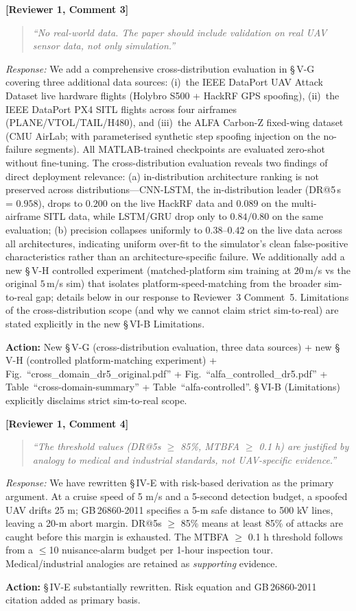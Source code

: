 \documentclass[11pt, a4paper]{article}
\newcommand{\reviewer}[2]{\medskip\noindent\textbf{\textcolor{revcolor}{[Reviewer #1, Comment #2]}}\par}
\newcommand{\response}[1]{\noindent\textit{Response:} #1\par}
\newcommand{\action}[1]{\noindent\textcolor{actcolor}{\textbf{Action:} #1}\smallskip\par}
\newcommand{\quoterev}[1]{\begin{quote}\textit{``#1''}\end{quote}}
\begin{document}
\reviewer{1}{3}
\quoterev{No real-world data. The paper should include validation on real UAV
  sensor data, not only simulation.}
\response{%
  We add a comprehensive cross-distribution evaluation in
  \S\,V-G covering three additional data sources:
  (i)~the IEEE DataPort UAV Attack Dataset live hardware flights
  (Holybro S500 + HackRF GPS spoofing),
  (ii)~the IEEE DataPort PX4 SITL flights across four airframes
  (PLANE/VTOL/TAIL/H480), and
  (iii)~the ALFA Carbon-Z fixed-wing dataset
  (CMU AirLab; with parameterised synthetic step spoofing injection
  on the no-failure segments).
  All MATLAB-trained checkpoints are evaluated zero-shot without
  fine-tuning. The cross-distribution evaluation reveals two findings of
  direct deployment relevance: (a) in-distribution architecture ranking
  is not preserved across distributions---CNN-LSTM, the in-distribution
  leader (DR@5\,s = $0.958$), drops to $0.200$ on the live HackRF data
  and $0.089$ on the multi-airframe SITL data, while LSTM/GRU
  drop only to $0.84/0.80$ on the same evaluation; (b) precision
  collapses uniformly to $0.38$--$0.42$ on the live data across all
  architectures, indicating uniform over-fit to the simulator's clean
  false-positive characteristics rather than an architecture-specific
  failure. We additionally add a new \S\,V-H controlled experiment
  (matched-platform sim training at $20$\,m/s vs the original
  $5$\,m/s sim) that isolates platform-speed-matching from the broader
  sim-to-real gap; details below in our response to Reviewer~3 Comment~5.
  Limitations of the cross-distribution scope (and why we cannot claim
  strict sim-to-real) are stated explicitly in the new
  \S\,VI-B Limitations.}
\action{New \S\,V-G (cross-distribution evaluation, three data sources)
  + new \S\,V-H (controlled platform-matching experiment)
  + Fig.~``cross\_domain\_dr5\_original.pdf''
  + Fig.~``alfa\_controlled\_dr5.pdf''
  + Table~``cross-domain-summary''
  + Table~``alfa-controlled''.
  \S\,VI-B (Limitations) explicitly disclaims strict sim-to-real scope.}

\reviewer{1}{4}
\quoterev{The threshold values (DR@5s $\geq$ 85\%, MTBFA $\geq$ 0.1 h) are
  justified by analogy to medical and industrial standards, not UAV-specific
  evidence.}
\response{%
  We have rewritten \S\,IV-E with risk-based derivation as the primary argument.
  At a cruise speed of 5 m/s and a 5-second detection budget, a spoofed UAV drifts
  25 m; GB\,26860-2011 specifies a 5-m safe distance to 500 kV lines, leaving a
  20-m abort margin. DR@5s $\geq$ 85\% means at least 85\% of attacks are caught
  before this margin is exhausted. The MTBFA $\geq$ 0.1 h threshold follows from
  a $\leq$10 nuisance-alarm budget per 1-hour inspection tour. Medical/industrial
  analogies are retained as \emph{supporting} evidence.}
\action{\S\,IV-E substantially rewritten. Risk equation and GB\,26860-2011
  citation added as primary basis.}
\end{document}
